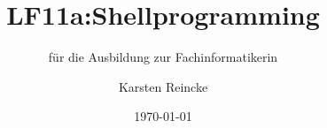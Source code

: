 \documentclass[]{beamer}
\title{LF11a:Shellprogramming}
\subtitle{für die Ausbildung zur Fachinformatikerin}
\institute[GS-LDK]{Gewerbliche Schulen Dillenburg}
\author{Karsten Reincke}
\date{\today}
\def\cfgGl{../../../cfg.gl/}
\begin{document}

\begin{frame}
  \titlepage

  
\end{frame}






\logo{}
\newpage



%
\end{document}
